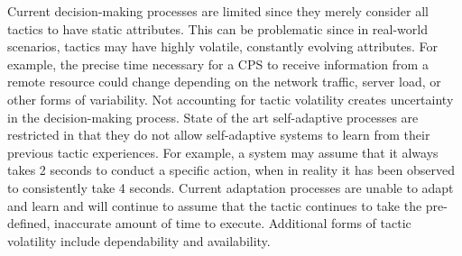 \documentclass[11pt]{proposalnsf}
\newcommand{\dan}[1]{\textcolor{blue}{{\it [Dan says: #1]}}}
\newlength\q %
\begin{document}
\begin{sloppypar}
Current decision-making processes are limited since they merely consider all tactics to have static attributes. This can be problematic since in real-world scenarios, tactics may have highly volatile, constantly evolving attributes. For example, the precise time necessary for a CPS to receive information from a remote resource could change depending on the network traffic, server load, or other forms of variability. Not accounting for tactic volatility creates uncertainty in the decision-making process. State of the art self-adaptive processes are restricted in that they do not allow self-adaptive systems to learn from their previous tactic experiences. For example, a system may assume that it always takes 2 seconds to conduct a specific action, when in reality it has been observed to consistently take 4 seconds. Current adaptation processes are unable to adapt and learn and will continue to assume that the tactic continues to take the pre-defined, inaccurate amount of time to execute. Additional forms of tactic volatility include dependability and availability.














\end{sloppypar}
\end{document}
